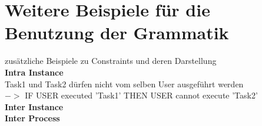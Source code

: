 
\chapter{Weitere Beispiele für die Benutzung der Grammatik} %

\label{GrammatikBeispiele} %


zusätzliche Beispiele zu Constraints und deren Darstellung\\
\textbf{Intra Instance}\\

Task1 und Task2 dürfen nicht vom selben User ausgeführt werden\\
$- >$ IF USER executed 'Task1' THEN USER cannot execute 'Task2'\\

\textbf{Inter Instance}\\

\textbf{Inter Process}\\

